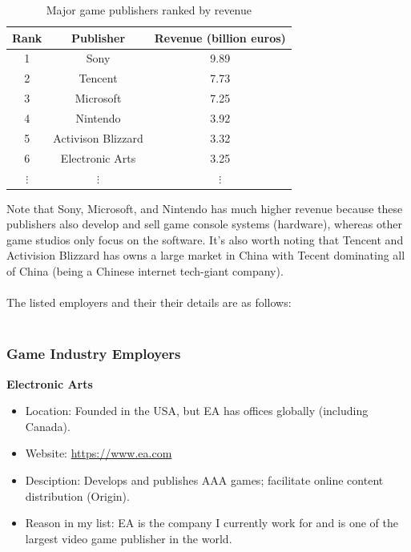 \documentclass[10pt,letterpaper]{article}
\begin{document}
\begin{table}[H]
	\centering
	\begin{tabular}{ |c|c|c| }
		\hline
		\textbf{Rank} & \textbf{Publisher} & \textbf{Revenue (billion euros)} \\
		\hline
		1             & Sony               & 9.89                             \\
		2             & Tencent            & 7.73                             \\
		3             & Microsoft          & 7.25                             \\
		4             & Nintendo           & 3.92                             \\
		5             & Activison Blizzard & 3.32                             \\
		6             & Electronic Arts    & 3.25                             \\
		$\vdots$      & $\vdots$           & $\vdots$                         \\
	\end{tabular}
	\caption{Major game publishers ranked by revenue\cite{game-publishers-revenue}}
	\label{table:revenue-ranking}
\end{table}

Note that Sony, Microsoft, and Nintendo has much higher revenue because these publishers also develop and sell game console systems (hardware), whereas other game studios only focus on the software. It's also worth noting that Tencent and Activision Blizzard has owns a large market in China with Tecent dominating all of China (being a Chinese internet tech-giant company)\cite{tencent-wiki}.\\
\\
The listed employers and their their details are as follows:\\
\\
\subsubsection{Game Industry Employers}
\textbf{Electronic Arts}
\begin{itemize}
	\item Location: Founded in the USA, but EA has offices globally (including Canada).
	\item Website: \url{https://www.ea.com}
	\item Desciption: Develops and publishes AAA games; facilitate online content distribution (Origin)\cite{origin}.
	\item Reason in my list: EA is the company I currently work for and is one of the largest video game publisher in the world.
\end{itemize}
\end{document}
